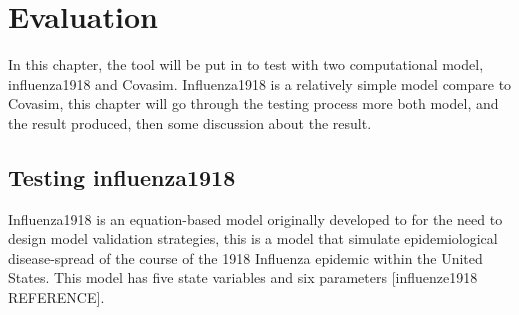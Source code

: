 \chapter{Evaluation}
In this chapter, the tool will be put in to test with two computational model, influenza1918 and Covasim. Influenza1918 is a relatively simple model compare to Covasim, this chapter will go through the testing process more both model, and the result produced, then some discussion about the result.
\section{Testing influenza1918}
Influenza1918 is an equation-based model originally developed to for the need to design model validation strategies, this is a model that simulate epidemiological disease-spread of the course of the 1918 Influenza epidemic within the United States.
This model has five state variables and six parameters [influenze1918 REFERENCE].
